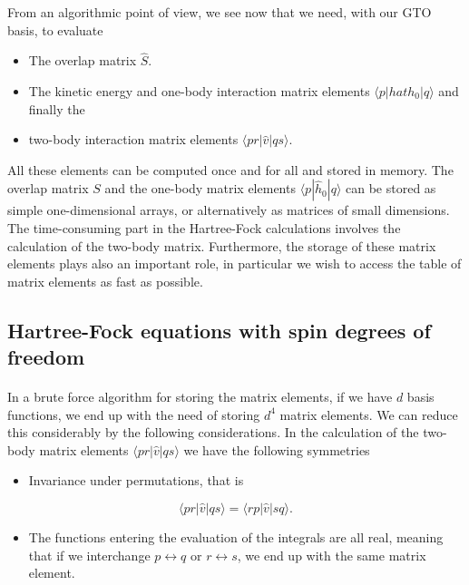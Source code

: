 \documentclass[%
twoside,                 %
final,                   %
10pt]{article}
\begin{document}
From an algorithmic point of view, we see now that we need, with our GTO basis, to evaluate 

\begin{itemize}
  \item The overlap matrix $\hat{S}$.

  \item The kinetic energy and one-body interaction matrix elements $\langle p|hat{h}_0|q\rangle $ and finally the

  \item two-body interaction matrix elements $\langle pr | \hat{v}|qs\rangle$.
\end{itemize}

\noindent
All these elements can be computed once and for all and stored in
memory. The overlap matrix $S$ and the one-body matrix elements
$\langle p|\hat{h}_0|q\rangle $ can be stored as simple
one-dimensional arrays, or alternatively as matrices of small
dimensions.  The time-consuming part in the Hartree-Fock calculations
involves the calculation of the two-body matrix. Furthermore, the
storage of these matrix elements plays also an important role, in
particular we wish to access the table of matrix elements as fast as
possible.



\subsection*{Hartree-Fock equations with spin degrees of freedom}

\paragraph{}

In a brute force algorithm for storing the matrix elements, if we have $d$ basis functions, we end up with the need of storing 
$d^4$ matrix elements. We can reduce this considerably by the following considerations.
In the calculation of the two-body matrix elements $\langle pr | \hat{v}|qs\rangle$ we have the following symmetries

\begin{itemize}
  \item Invariance under permutations, that is  
\end{itemize}

\noindent
\begin{equation*} \langle pr | \hat{v}|qs\rangle = \langle rp | \hat{v}|sq\rangle.
\end{equation*}
\begin{itemize}
  \item The functions entering the evaluation of the integrals are all real, meaning that if we interchange $p\leftrightarrow q$ or  $r\leftrightarrow s$, we end up with the same matrix element.
\end{itemize}
\end{document}
